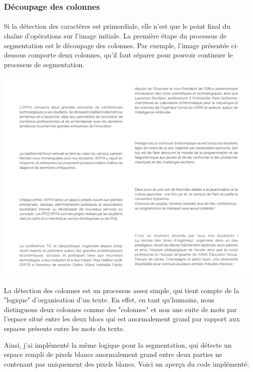 \documentclass{article}
\begin{document}
    \subsubsection{Découpage des colonnes}
    \paragraph{}
    Si la détection des caractères est primordiale, elle n'est que le point final du chaîne d'opérations sur l'image initiale. La première étape du processus de segmentation est le découpage des colonnes. Par exemple, l'image présentée ci-dessous comporte deux colonnes, qu'il faut séparer pour pouvoir continuer le processus de segmentation. \\
    
    \begin{center}
    	\includegraphics[scale=0.3]{paragraph}
    \end{center}
    
    \paragraph{}
    La détection des colonnes est un processus assez simple, qui tient compte de la "logique" d'organisation d'un texte. En effet, en tant qu'humains, nous distinguons deux colonnes comme des "colonnes" et non une suite de mots par l'espace situé entre les deux blocs qui est anormalement grand par rapport aux espaces présents entre les mots du texte.
    \par
    Ainsi, j'ai implémenté la même logique pour la segmentation, qui détecte un espace rempli de pixels blancs anormalement grand entre deux parties ne contenant pas uniquement des pixels blancs. Voici un aperçu du code implémenté:
    
\end{document}
